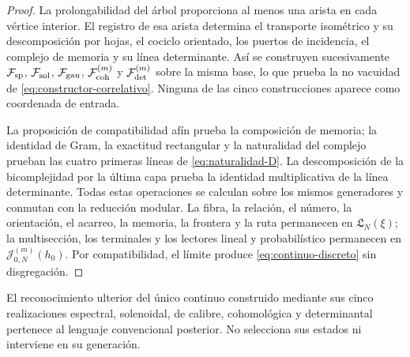\begin{proof}
La prolongabilidad del árbol proporciona al menos una arista en cada vértice
interior. El registro de esa arista determina el transporte isométrico y su
descomposición por hojas, el cociclo orientado, los puertos de incidencia, el
complejo de memoria y su línea determinante. Así se construyen sucesivamente
\(\mathcal F_{\rm sp}\), \(\mathcal F_{\rm sol}\),
\(\mathcal F_{\rm gau}\), \(\mathcal F_{\rm coh}^{(m)}\) y
\(\mathcal F_{\rm det}^{(m)}\) sobre la misma base, lo que prueba la no
vacuidad de \eqref{eq:constructor-correlativo}. Ninguna de las cinco
construcciones aparece como coordenada de entrada.

La proposición de compatibilidad afín prueba la composición de memoria; la
identidad de Gram, la exactitud rectangular y la naturalidad del complejo
prueban las cuatro primeras líneas de \eqref{eq:naturalidad-D}. La
descomposición de la bicomplejidad por la última capa prueba la identidad
multiplicativa de la línea determinante. Todas estas operaciones se calculan
sobre los mismos generadores y conmutan con la reducción modular. La fibra,
la relación, el número, la orientación, el acarreo, la memoria, la frontera y
la ruta permanecen en \(\mathfrak L_N(\xi)\); la multisección, los terminales
y los lectores lineal y probabilístico permanecen en
\(\mathcal J_{0,N}^{(m)}(h_0)\). Por compatibilidad, el límite produce
\eqref{eq:continuo-discreto} sin disgregación.
\end{proof}

El reconocimiento ulterior del único continuo construido mediante sus cinco
realizaciones espectral, solenoidal, de calibre, cohomológica y determinantal
pertenece al lenguaje convencional posterior. No selecciona sus estados ni
interviene en su generación.
\fi


